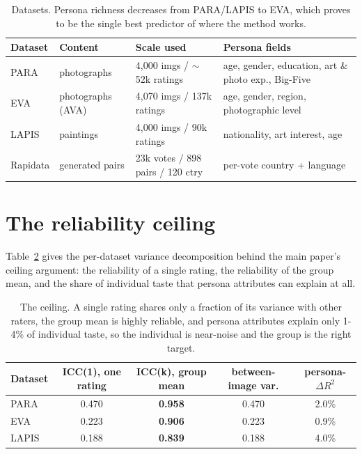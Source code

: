 \documentclass[10pt,twocolumn,letterpaper]{article}
\begin{document}
\begin{table}[t]
  \caption{Datasets. Persona richness decreases from PARA/LAPIS to EVA, which proves to be the single best predictor of where the method works.}
  \label{tab:data}
  \centering
  \small
  \setlength{\tabcolsep}{5pt}
  \begin{tabular}{lllp{4.6cm}}
    \toprule
    Dataset & Content & Scale used & Persona fields \\
    \midrule
    PARA     & photographs        & 4{,}000 imgs / $\sim$52k ratings & age, gender, education, art \& photo exp., Big-Five \\
    EVA      & photographs (AVA)  & 4{,}070 imgs / 137k ratings      & age, gender, region, photographic level \\
    LAPIS    & paintings          & 4{,}000 imgs / 90k ratings       & nationality, art interest, age \\
    Rapidata & generated pairs    & 23k votes / 898 pairs / 120 ctry & per-vote country + language \\
    \bottomrule
  \end{tabular}
\end{table}

\section{The reliability ceiling}
Table~\ref{tab:ceiling} gives the per-dataset variance decomposition behind the main paper's ceiling argument: the reliability of a single rating, the reliability of the group mean, and the share of individual taste that persona attributes can explain at all.

\begin{table}[t]
  \caption{The ceiling. A single rating shares only a fraction of its variance with other raters, the group mean is highly reliable, and persona attributes explain only 1-4\% of individual taste, so the individual is near-noise and the group is the right target.}
  \label{tab:ceiling}
  \centering
  \small
  \begin{tabular}{lcccc}
    \toprule
    Dataset & ICC(1), one rating & ICC(k), group mean & between-image var. & persona-$\Delta R^2$ \\
    \midrule
    PARA  & 0.470 & \textbf{0.958} & 0.470 & 2.0\% \\
    EVA   & 0.223 & \textbf{0.906} & 0.223 & 0.9\% \\
    LAPIS & 0.188 & \textbf{0.839} & 0.188 & 4.0\% \\
    \bottomrule
  \end{tabular}
\end{table}
\end{document}
